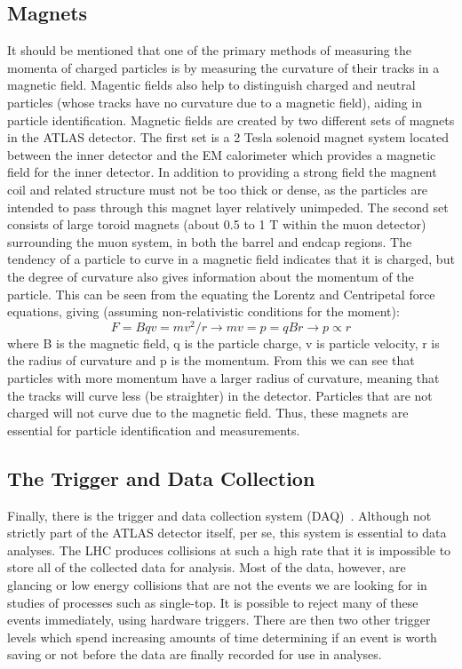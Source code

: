 \subsection{Magnets}
It should be mentioned that one of the primary methods of measuring the momenta of charged particles is by measuring the curvature of their tracks in a magnetic field.  Magentic fields also help to distinguish charged and neutral particles (whose tracks have no curvature due to a magnetic field), aiding in particle identification.  Magnetic fields are created by two different sets of magnets in the ATLAS detector.  The first set is a 2 Tesla solenoid magnet system located between the inner detector and the EM calorimeter which provides a magnetic field for the inner detector.  In addition to providing a strong field the magnent coil and related structure must not be too thick or dense, as the particles are intended to pass through this magnet layer relatively unimpeded.  The second set consists of large toroid magnets (about 0.5 to 1 T within the muon detector) surrounding the muon system, in both the barrel and endcap regions. The tendency of a particle to curve in a magnetic field indicates that it is charged, but the degree of curvature also gives information about the momentum of the particle.  This can be seen from the equating the Lorentz and Centripetal force equations, giving (assuming non-relativistic conditions for the moment):
\begin{equation} F = Bqv = mv^2 /r \rightarrow mv = p = qBr \rightarrow p \propto r\end{equation}
where B is the magnetic field, q is the particle charge, v is particle velocity, r is the radius of curvature and p is the momentum.  From this we can see that particles with more momentum have a larger radius of curvature, meaning that the tracks will curve less (be straighter) in the detector.  Particles that are not charged will not curve due to the magnetic field.  Thus, these magnets are essential for particle identification and measurements.

\subsection{The Trigger and Data Collection}
Finally, there is the trigger and data collection system (DAQ)~\cite{Trigger2010}.  Although not strictly part of the ATLAS detector itself, per se, this system is essential to data analyses.  The LHC produces collisions at such a high rate that it is impossible to store all of the collected data for analysis.  Most of the data, however, are glancing or low energy collisions that are not the events we are looking for in studies of processes such as single-top.  It is possible to reject many of these events immediately, using hardware triggers.  There are then two other trigger levels which spend increasing amounts of time determining if an event is worth saving or not before the data are finally recorded for use in analyses.

